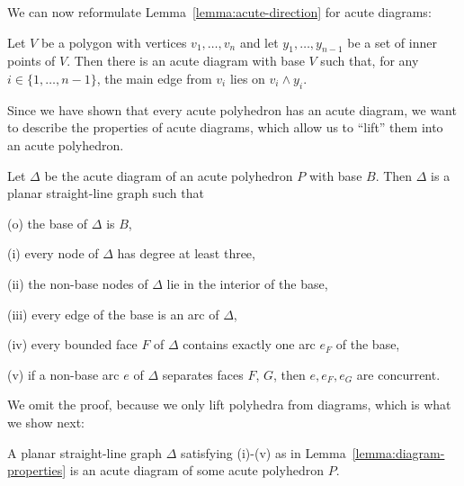 We can now reformulate Lemma~\ref{lemma:acute-direction} for acute diagrams:

\begin{corollary}\label{corollary:acute-direction}
  Let $V$ be a polygon with vertices $v_1,\dots,v_n$ and let $y_1,\dots,y_{n-1}$ be a set of inner points of $V$.
  Then there is an acute diagram with base $V$ such that, for any $i \in \{1,\dots,n-1\}$, the main edge from $v_i$ lies on $v_i \wedge y_i$.
\end{corollary}

Since we have shown that every acute polyhedron has an acute diagram, we want to describe the properties of acute diagrams, which allow us to ``lift'' them into an acute polyhedron.

\begin{lemma}\label{lemma:diagram-properties}
  Let $\Delta$ be the acute diagram of an acute polyhedron $P$ with base $B$.
  Then $\Delta$ is a planar straight-line graph such that

  (o) the base of $\Delta$ is $B$,

  (i) every node of $\Delta$ has degree at least three,

  (ii) the non-base nodes of $\Delta$ lie in the interior of the base,

  (iii) every edge of the base is an arc of $\Delta$,

  (iv) every bounded face $F$ of $\Delta$ contains exactly one arc $e_F$ of the base,

  (v) if a non-base arc $e$ of $\Delta$ separates faces $F$, $G$, then $e, e_F, e_G$ are concurrent.
\end{lemma}

We omit the proof, because we only lift polyhedra from diagrams, which is what we show next:

\begin{lemma}\label{lemma:lifting}
  A planar straight-line graph $\Delta$ satisfying (i)-(v) as in Lemma~\ref{lemma:diagram-properties} is an acute diagram of some acute polyhedron $P$.
\end{lemma}

